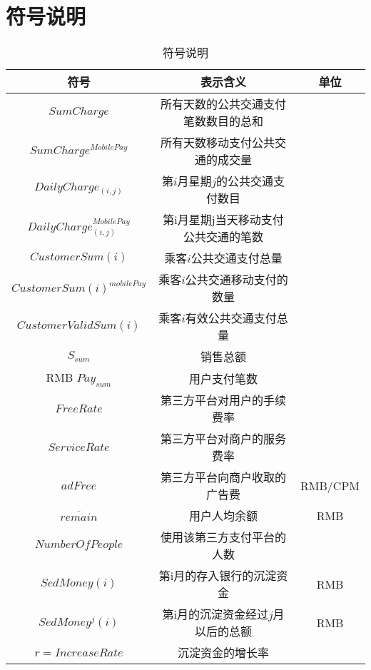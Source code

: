 \documentclass[withoutpreface,bwprint]{cumcmthesis} %
\begin{document}
\section{符号说明}
\begin{center}
\makeatletter{}\makeatother
\begin{table}[htbp]
\small 
\centering
\caption{符号说明}\label{tab:aStrangeTable}\centering%
\begin{tabular}{c|c|c}\hline
符号& 表示含义& 单位\\\hline
$SumCharge$ & 所有天数的公共交通支付笔数数目的总和 & \\
$SumCharge^{MobilePay}$ & 所有天数移动支付公共交通的成交量 & \\
$DailyCharge_{(i,j)}$&第$i$月星期$j$的公共交通支付数目&\\
$DailyCharge^{MobilePay}_{(i,j)}$&第i月星期j当天移动支付公共交通的笔数&\\
$CustomerSum(i)$&乘客$i$公共交通支付总量&\\
$CustomerSum(i)^{mobilePay}$&乘客$i$公共交通移动支付的数量&\\
$CustomerValidSum(i)$&乘客$i$有效公共交通支付总量&\\
$S_{sum}$&销售总额&\\RMB
$Pay_{sum}$&用户支付笔数&\\
$FreeRate$&第三方平台对用户的手续费率&\\
$ServiceRate$&第三方平台对商户的服务费率&\\
$adFree$&第三方平台向商户收取的广告费&RMB/CPM\\
$\overline {remain}$&用户人均余额&RMB\\
${NumberOfPeople}$&使用该第三方支付平台的人数&\\
$SedMoney(i)$&第i月的存入银行的沉淀资金&RMB\\
$SedMoney^j(i)$&第i月的沉淀资金经过$j$月以后的总额&RMB\\
$r=IncreaseRate$&沉淀资金的增长率&\\\hline
\end{tabular}
\end{table}
\end{center}
\end{document}
